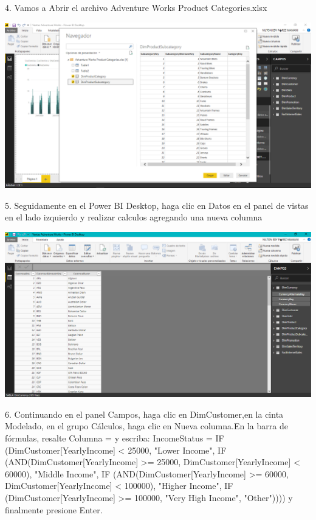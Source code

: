 \begin{itemize}
4. Vamos a Abrir el archivo Adventure Works Product Categories.xlsx
\end{itemize} 

\begin{center}
\includegraphics[width=15cm]{./Imagenes/Imagen4} 
\end{center}

\begin{itemize}
5. Seguidamente en el Power BI Desktop, haga clic en Datos en el panel de vistas en el lado izquierdo y realizar calculos agregando una nueva columna

\end{itemize}

\begin{center}
\includegraphics[width=15cm]{./Imagenes/Imagen5} 
\end{center}

\begin{itemize}
6. Continuando en el panel Campos, haga clic en DimCustomer,en la cinta Modelado, en el grupo Cálculos, haga clic en Nueva columna.En la barra de fórmulas, resalte Columna = y escriba:
IncomeStatus = IF (DimCustomer[YearlyIncome] < 25000, "Lower Income",
IF (AND(DimCustomer[YearlyIncome] >= 25000, DimCustomer[YearlyIncome] < 60000),
"Middle Income",
IF (AND(DimCustomer[YearlyIncome] >= 60000, DimCustomer[YearlyIncome] < 100000),
"Higher Income",
IF (DimCustomer[YearlyIncome] >= 100000, "Very High Income", "Other")))) y finalmente presione Enter.
\end{itemize}


